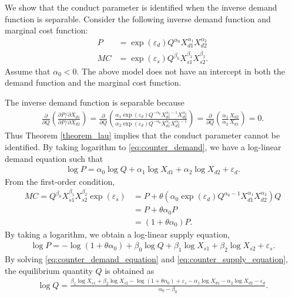 \documentclass[11pt, a4paper]{article}
\theoremstyle{remark}
\begin{document}
We show that the conduct parameter is identified when the inverse demand function is separable. 
Consider the following inverse demand function and marginal cost function:
\begin{align}
    P & = \exp(\varepsilon_{d}) Q^{\alpha_0} X_{d1}^{\alpha_1}X_{d2}^{\alpha_2}\label{eq:counter_demand}\\
    MC & = \exp(\varepsilon_{s})Q^{\beta_0} X_{s1}^{\beta_1} X_{s2}^{\beta_2}.\label{eq:counter_mc}
\end{align}
Assume that $\alpha_0 <0$.
The above model does not have an intercept in both the demand function and the marginal cost function. 

The inverse demand function is separable because
\begin{align}
    \frac{\partial }{\partial Q} \left(\frac{\partial P/\partial X_{d1}}{\partial P/\partial X_{d2}} \right) = \frac{\partial }{\partial Q} \left(\frac{\alpha_{1}\exp(\varepsilon_{d}) Q^{-\alpha_0} X_{d1}^{\alpha_1-1}X_{d2}^{\alpha_2}}{\alpha_2\exp(\varepsilon_{d}) Q^{-\alpha_0} X_{d1}^{\alpha_1}X_{d2}^{\alpha_2-1}} \right) =  \frac{\partial }{\partial Q}\left(\frac{\alpha_1}{\alpha_2} \frac{X_{d2}}{X_{d1}} \right)=0.
\end{align}
Thus Theorem \ref{theorem_lau} implies that the conduct parameter cannot be identified.
By taking logarithm to \eqref{eq:counter_demand}, we have a log-linear demand equation such that 
\begin{align}
    \log P = \alpha_0 \log Q + \alpha_1 \log X_{d1}  + \alpha_2 \log X_{d2} + \varepsilon_{d}.\label{eq:counter_demand_equation}
\end{align}
From the first-order condition, 
\begin{align}
    MC = Q^{\beta_0} X_{s1}^{\beta_1}X_{s2}^{\beta_2}\exp(\varepsilon_{s}) & = P + \theta (\alpha_0 \exp(\varepsilon_{d})Q^{\alpha_0-1}X_{d1}^{\alpha_1}X_{d2}^{\alpha_2}) Q\\
    & = P + \theta \alpha_0 P\\
    &= (1 + \theta\alpha_0) P.
\end{align}
By taking a logarithm, we obtain a log-linear supply equation,
\begin{align}
    \log P = - \log(1 + \theta\alpha_0) + \beta_0 \log Q + \beta_1 \log X_{s1}+\beta_2 \log X_{s2} + \varepsilon_{s}.\label{eq:counter_supply_equation}
\end{align}
By solving \eqref{eq:counter_demand_equation} and \eqref{eq:counter_supply_equation}, the equilibrium quantity $Q$ is obtained as
\begin{align}
    \log Q = \frac{\beta_1 \log X_{s1}+\beta_2 \log X_{s2} - \log(1 + \theta\alpha_0)+ \varepsilon_{s} - \alpha_1 \log X_{d1}  - \alpha_2 \log X_{d2} - \varepsilon_{d} }{\alpha_0 - \beta_0}.
\end{align}
\end{document}
